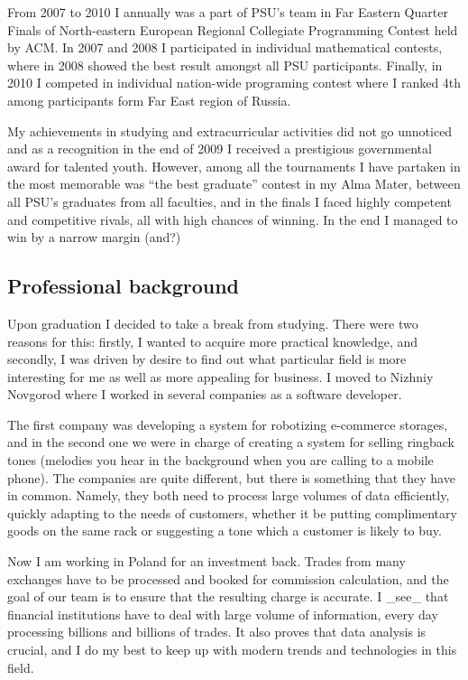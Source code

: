 \documentclass[a4paper,14pt]{extarticle}
\begin{document}
From 2007 to 2010 I annually was a part of PSU's team in Far Eastern Quarter Finals of North-eastern European Regional Collegiate Programming Contest held by ACM. In 2007 and 2008 I participated in individual mathematical contests, where in 2008 showed the best result amongst all PSU participants. Finally, in 2010 I competed in individual nation-wide programing contest where I ranked 4th among participants form Far East region of Russia.

My achievements in studying and extracurricular activities did not go unnoticed and as a recognition in the end of 2009 I received a prestigious governmental award for talented youth. However, among all the tournaments I have partaken in the most memorable was ``the best graduate'' contest in my Alma Mater, between all PSU's graduates from all faculties, and in the finals I faced highly competent and competitive rivals, all with high chances of winning. In the end I managed to win by a narrow margin (and?)

\subsection*{Professional background}

Upon graduation I decided to take a break from studying. There were two reasons for this: firstly, I wanted to acquire more practical knowledge, and secondly, I was driven by desire to find out what particular field is more interesting for me as well as more appealing for business. I moved to Nizhniy Novgorod where I worked in several companies as a software developer.

The first company was developing a system for robotizing e-commerce storages, and in the second one we were in charge of creating a system for selling ringback tones (melodies you hear in the background when you are calling to a mobile phone). The companies are quite different, but there is something that they have in common. Namely, they both need to process large volumes of data efficiently, quickly adapting to the needs of customers, whether it be putting complimentary goods on the same rack or suggesting a tone which a customer is likely to buy.

Now I am working in Poland for an investment back. Trades from many exchanges have to be processed and booked for commission calculation, and the goal of our team is to ensure that the resulting charge is accurate. I _see_ that financial institutions have to deal with large volume of information, every day processing billions and billions of trades. It also proves that data analysis is crucial, and I do my best to keep up with modern trends and technologies in this field.
\end{document}
